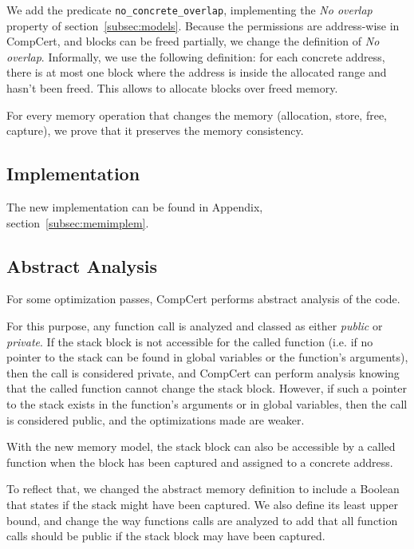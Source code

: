 We add the predicate \texttt{no\_concrete\_overlap}, implementing the \textit{No overlap} property of section~\ref{subsec:models}. Because the permissions are address-wise in CompCert, and blocks can be freed partially, we change the definition of \textit{No overlap}. Informally, we use the following definition: for each concrete address, there is at most one block where the address is inside the allocated range and hasn't been freed. This allows to allocate blocks over freed memory.

For every memory operation that changes the memory (allocation, store, free, capture), we prove that it preserves the memory consistency.

\subsection{Implementation}
The new implementation can be found in Appendix, section~\ref{subsec:memimplem}.

\subsection{Abstract Analysis}

For some optimization passes, CompCert performs abstract analysis of the code.

For this purpose, any function call is analyzed and classed as either \textit{public} or \textit{private}. If the stack block is not accessible for the called function (i.e. if no pointer to the stack can be found in global variables or the function's arguments), then the call is considered private, and CompCert can perform analysis knowing that the called function cannot change the stack block. However, if such a pointer to the stack exists in the function's arguments or in global variables, then the call is considered public, and the optimizations made are weaker.

With the new memory model, the stack block can also be accessible by a called function when the block has been captured and assigned to a concrete address.

To reflect that, we changed the abstract memory definition to include a Boolean that states if the stack might have been captured. We also define its least upper bound, and change the way functions calls are analyzed to add that all function calls should be public if the stack block may have been captured.
